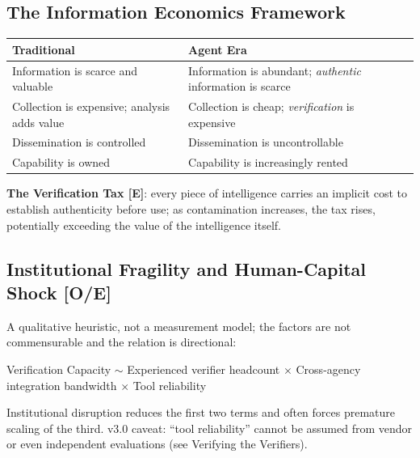 \documentclass[11pt,letterpaper]{article}
\begin{document}
\subsection{The Information Economics Framework}

\begin{center}
\small
\begin{tabularx}{\linewidth}{ZY{0.96}Y{1.04}}
\toprule
\textbf{Traditional} & \textbf{Agent Era} \\
\midrule
Information is scarce and valuable & Information is abundant; \textit{authentic} information is scarce \\
Collection is expensive; analysis adds value & Collection is cheap; \textit{verification} is expensive \\
Dissemination is controlled & Dissemination is uncontrollable \\
Capability is owned & Capability is increasingly rented \\
\bottomrule
\end{tabularx}
\end{center}

\textbf{The Verification Tax [E]}: every piece of intelligence carries an implicit cost to establish authenticity before use; as contamination increases, the tax rises, potentially exceeding the value of the intelligence itself.

\subsection{Institutional Fragility and Human-Capital Shock [O/E]}

\begin{defbox}
A qualitative heuristic, not a measurement model; the factors are not commensurable and the relation is directional:
\begin{center}
\small Verification Capacity $\sim$ Experienced verifier headcount $\times$ Cross-agency integration bandwidth $\times$ Tool reliability
\end{center}
Institutional disruption reduces the first two terms and often forces premature scaling of the third. v3.0 caveat: ``tool reliability'' cannot be assumed from vendor or even independent evaluations (see Verifying the Verifiers).
\end{defbox}
\end{document}
